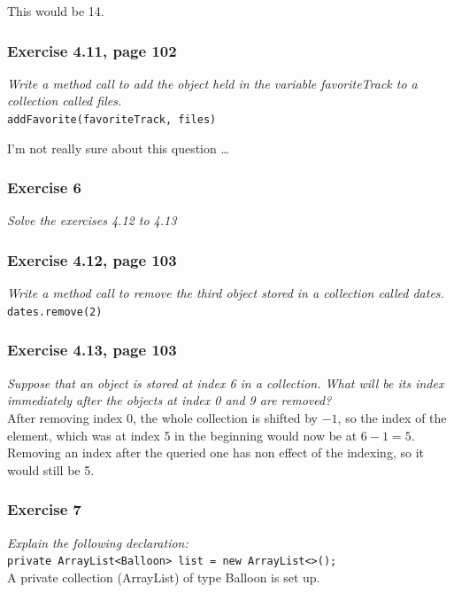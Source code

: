 This would be 14.

\subsubsection*{Exercise 4.11, page 102}
\textit{Write a method call to add the object held in the variable 
favoriteTrack to a collection called files.}\\

\lstinline{addFavorite(favoriteTrack, files)}

I'm not really sure about this question \dots

\subsubsection*{Exercise 6}
\textit{Solve the exercises 4.12 to 4.13}\\

\subsubsection*{Exercise 4.12, page 103}
\textit{Write a method call to remove the third object stored in a
collection called dates.}\\

\lstinline{dates.remove(2)}

\subsubsection*{Exercise 4.13, page 103}
\textit{Suppose that an object is stored at index 6 in a collection.
What will be its index immediately after the objects at index 0 and 9
are removed?}\\

After removing index 0, the whole collection is shifted by $-1$, 
so the index of the element, which was at index 5 in the beginning
would now be at $6-1=5$. Removing an index after the queried one has
non effect of the indexing, so it would still be 5.

\subsubsection*{Exercise 7}
\textit{Explain the following declaration:}\\
\lstinline?private ArrayList<Balloon> list = new ArrayList<>();?\\

A private collection (ArrayList) of type Balloon is set up.

